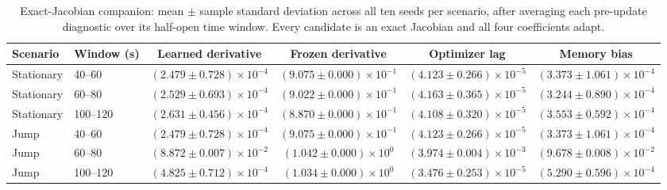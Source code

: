 \begin{table}[t]
\centering
\caption{Exact-Jacobian companion: mean $\pm$ sample standard deviation across all ten seeds per scenario, after averaging each pre-update diagnostic over its half-open time window. Every candidate is an exact Jacobian and all four coefficients adapt.}
\label{tab:direct_jacobian_results}
\begin{tabular}{llcccc}
\toprule
Scenario & Window (s) & Learned derivative & Frozen derivative & Optimizer lag & Memory bias\\
\midrule
Stationary & 40--60 & $(2.479\pm0.728)\times10^{-4}$ & $(9.075\pm0.000)\times10^{-1}$ & $(4.123\pm0.266)\times10^{-5}$ & $(3.373\pm1.061)\times10^{-4}$\\
Stationary & 60--80 & $(2.529\pm0.693)\times10^{-4}$ & $(9.022\pm0.000)\times10^{-1}$ & $(4.163\pm0.365)\times10^{-5}$ & $(3.244\pm0.890)\times10^{-4}$\\
Stationary & 100--120 & $(2.631\pm0.456)\times10^{-4}$ & $(8.870\pm0.000)\times10^{-1}$ & $(4.108\pm0.320)\times10^{-5}$ & $(3.553\pm0.592)\times10^{-4}$\\
\midrule
Jump & 40--60 & $(2.479\pm0.728)\times10^{-4}$ & $(9.075\pm0.000)\times10^{-1}$ & $(4.123\pm0.266)\times10^{-5}$ & $(3.373\pm1.061)\times10^{-4}$\\
Jump & 60--80 & $(8.872\pm0.007)\times10^{-2}$ & $(1.042\pm0.000)\times10^{0}$ & $(3.974\pm0.004)\times10^{-3}$ & $(9.678\pm0.008)\times10^{-2}$\\
Jump & 100--120 & $(4.825\pm0.712)\times10^{-4}$ & $(1.034\pm0.000)\times10^{0}$ & $(3.476\pm0.253)\times10^{-5}$ & $(5.290\pm0.596)\times10^{-4}$\\
\bottomrule
\end{tabular}
\end{table}

